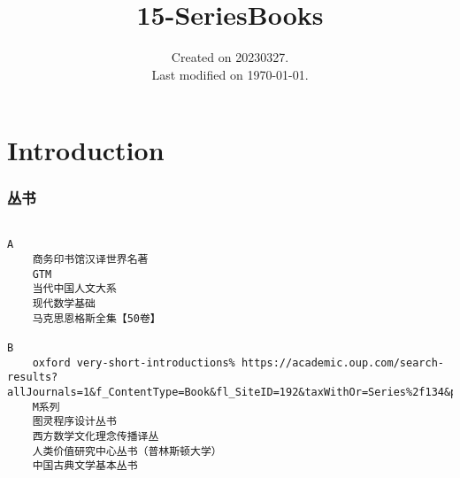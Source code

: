 \documentclass[UTF8]{../RepresentationUniverse}
\begin{document}
\title{15-SeriesBooks}
\date{Created on 20230327.\\   Last modified on \today.}
\maketitle
\tableofcontents


\chapter{Introduction}


\subsection{丛书}

\begin{lstlisting}

A  
    商务印书馆汉译世界名著
    GTM
    当代中国人文大系
    现代数学基础
    马克思恩格斯全集【50卷】

B
    oxford very-short-introductions% https://academic.oup.com/search-results?allJournals=1&f_ContentType=Book&fl_SiteID=192&taxWithOr=Series%2f134&page=1&sort=Date+%e2%80%93+Oldest+First
    M系列
    图灵程序设计丛书
    西方数学文化理念传播译丛
    人类价值研究中心丛书（普林斯顿大学）
    中国古典文学基本丛书
    
\end{lstlisting}
\end{document}

